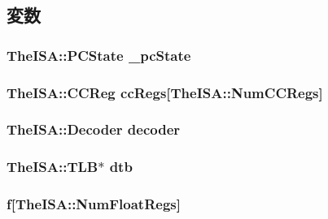 \subsection{変数}
\hypertarget{classSimpleThread_af217f22b3a4af1960222745e7e2b36c8}{
\subsubsection[{\_\-pcState}]{\setlength{\rightskip}{0pt plus 5cm}TheISA::PCState {\bf \_\-pcState}}}
\label{classSimpleThread_af217f22b3a4af1960222745e7e2b36c8}
\hypertarget{classSimpleThread_a0e0d321ede8414ee0cd5e6f93ff51dc2}{
\subsubsection[{ccRegs}]{\setlength{\rightskip}{0pt plus 5cm}TheISA::CCReg {\bf ccRegs}\mbox{[}TheISA::NumCCRegs\mbox{]}}}
\label{classSimpleThread_a0e0d321ede8414ee0cd5e6f93ff51dc2}
\hypertarget{classSimpleThread_a8adfd3ea89691b05b671dd288a595958}{
\subsubsection[{decoder}]{\setlength{\rightskip}{0pt plus 5cm}TheISA::Decoder {\bf decoder}}}
\label{classSimpleThread_a8adfd3ea89691b05b671dd288a595958}
\hypertarget{classSimpleThread_ad2fd039621f87592c4b344d4f8948e78}{
\subsubsection[{dtb}]{\setlength{\rightskip}{0pt plus 5cm}TheISA::TLB$\ast$ {\bf dtb}}}
\label{classSimpleThread_ad2fd039621f87592c4b344d4f8948e78}
\hypertarget{classSimpleThread_a1ad2ddcae8ed0b6b5f1807294a6093e7}{
\subsubsection[{f}]{ {\bf f}\mbox{[}TheISA::NumFloatRegs\mbox{]}}}
